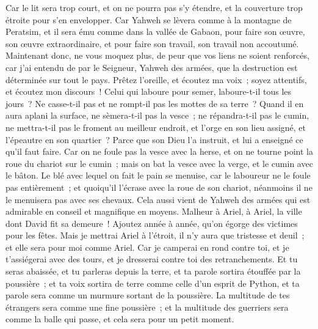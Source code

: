 \begin{multicols}{2}
Car le lit sera trop court, et on ne pourra pas s'y étendre, et la couverture trop étroite pour s'en envelopper.
Car Yahweh se lèvera comme à la montagne de Peratsim, et il sera ému comme dans la vallée de Gabaon, pour faire son œuvre, son œuvre extraordinaire, et pour faire son travail, son travail non accoutumé.
Maintenant donc, ne vous moquez plus, de peur que vos liens ne soient renforcés, car j'ai entendu de par le Seigneur, Yahweh des armées, que la destruction est déterminée sur tout le pays.
Prêtez l'oreille, et écoutez ma voix~; soyez attentifs, et écoutez mon discours~!
Celui qui laboure pour semer, laboure-t-il tous les jours~? Ne casse-t-il pas et ne rompt-il pas les mottes de sa terre~?
Quand il en aura aplani la surface, ne sèmera-t-il pas la vesce~; ne répandra-t-il pas le cumin, ne mettra-t-il pas le froment au meilleur endroit, et l'orge en son lieu assigné, et l'épeautre en son quartier~?
Parce que son Dieu l'a instruit, et lui a enseigné ce qu'il faut faire.
Car on ne foule pas la vesce avec la herse, et on ne tourne point la roue du chariot sur le cumin~; mais on bat la vesce avec la verge, et le cumin avec le bâton.
Le blé avec lequel on fait le pain se menuise, car le laboureur ne le foule pas entièrement~; et quoiqu'il l'écrase avec la roue de son chariot, néanmoins il ne le menuisera pas avec ses chevaux.
Cela aussi vient de Yahweh des armées qui est admirable en conseil et magnifique en moyens.
\VerseOne{}Malheur à Ariel, à Ariel, la ville dont David fit sa demeure~! Ajoutez année à année, qu'on égorge des victimes pour les fêtes.
Mais je mettrai Ariel à l'étroit, il n'y aura que tristesse et deuil~; et elle sera pour moi comme Ariel.
Car je camperai en rond contre toi, et je t'assiégerai avec des tours, et je dresserai contre toi des retranchements.
Et tu seras abaissée, et tu parleras depuis la terre, et ta parole sortira étouffée par la poussière~; et ta voix sortira de terre comme celle d'un esprit de Python, et ta parole sera comme un murmure sortant de la poussière.
La multitude de tes étrangers sera comme une fine poussière~; et la multitude des guerriers sera comme la balle qui passe, et cela sera pour un petit moment.

\end{multicols}
